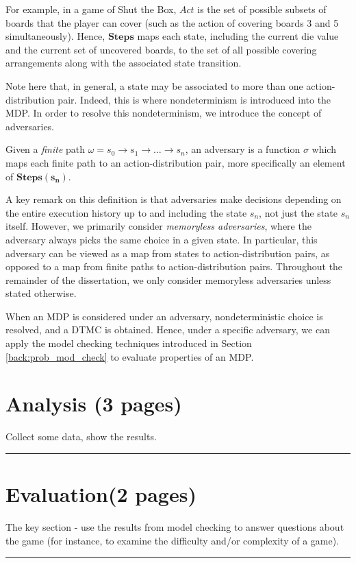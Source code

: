 For example, in a game of Shut the Box, $Act$ is the set of possible subsets of boards that the player can cover (such as the action of covering boards 3 and 5 simultaneously). Hence, $\mathbf{Steps}$ maps each state, including the current die value and the current set of uncovered boards, to the set of all possible covering arrangements along with the associated state transition.

Note here that, in general, a state may be associated to more than one action-distribution pair. Indeed, this is where nondeterminism is introduced into the MDP. In order to resolve this nondeterminism, we introduce the concept of adversaries.

\begin{definition}
\label{cs1:adversaries}

Given a \emph{finite} path $\omega = s_0 \rightarrow s_1 \rightarrow \dots \rightarrow s_n$, an adversary is a function $\sigma$ which maps each finite path to an action-distribution pair, more specifically an element of $\mathbf{Steps(s_n)}$.

\end{definition}

A key remark on this definition is that adversaries make decisions depending on the entire execution history up to and including the state $s_n$, not just the state $s_n$ itself. However, we primarily consider \emph{memoryless adversaries}, where the adversary always picks the same choice in a given state. In particular, this adversary can be viewed as a map from states to action-distribution pairs, as opposed to a map from finite paths to action-distribution pairs. Throughout the remainder of the dissertation, we only consider memoryless adversaries unless stated otherwise.

When an MDP is considered under an adversary, nondeterministic choice is resolved, and a DTMC is obtained. Hence, under a specific adversary, we can apply the model checking techniques introduced in Section \ref{back:prob_mod_check} to evaluate properties of an MDP.

\section{Analysis (3 pages)}

Collect some data, show the results.

\hrule

\Blindtext

\Blindtext

\Blindtext

\section{Evaluation(2 pages)}

The key section - use the results from model checking to answer questions about the game (for instance, to examine the difficulty and/or complexity of a game).

\hrule

\Blindtext

\Blindtext